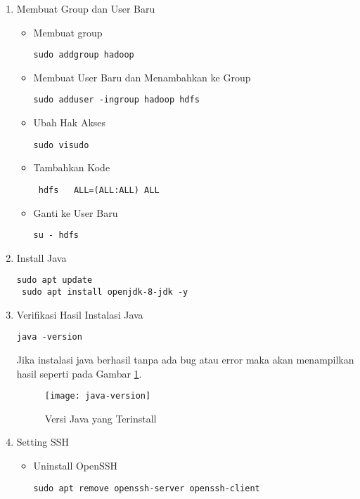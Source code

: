 \documentclass[a4paper]{tufte-handout}
\begin{document}
\begin{enumerate}
\item Membuat Group dan User Baru
\begin{itemize}
\item Membuat group
\begin{lstlisting}[language=Terminal]
 sudo addgroup hadoop
\end{lstlisting}

\item Membuat User Baru dan Menambahkan ke Group
\begin{lstlisting}[language=Terminal]
 sudo adduser -ingroup hadoop hdfs
\end{lstlisting}

\item Ubah Hak Akses
\begin{lstlisting}[language=Terminal]
 sudo visudo
\end{lstlisting}

\item Tambahkan Kode
\begin{lstlisting}
 hdfs	ALL=(ALL:ALL) ALL
\end{lstlisting}

\item Ganti ke User Baru
\begin{lstlisting}[language=Terminal]
 su - hdfs
\end{lstlisting}
\end{itemize}

\item Install Java
\begin{lstlisting}[language=Terminal]
 sudo apt update
 sudo apt install openjdk-8-jdk -y
\end{lstlisting}


\item Verifikasi Hasil Instalasi Java
\begin{lstlisting}[language=Terminal]
 java -version
\end{lstlisting}

Jika instalasi java berhasil tanpa ada bug atau error maka akan menampilkan hasil seperti pada Gambar \ref{gam:java-version}.

\begin{figure}
\setlength{\belowcaptionskip}{-10pt}
\texttt{[image: java-version]}
\caption{Versi Java yang Terinstall}
\label{gam:java-version}
\end{figure}

\item Setting SSH
\begin{itemize}
\item Uninstall OpenSSH
\begin{lstlisting}[language=Terminal]
 sudo apt remove openssh-server openssh-client
\end{lstlisting}


\end{itemize}
\end{enumerate}
\end{document}
